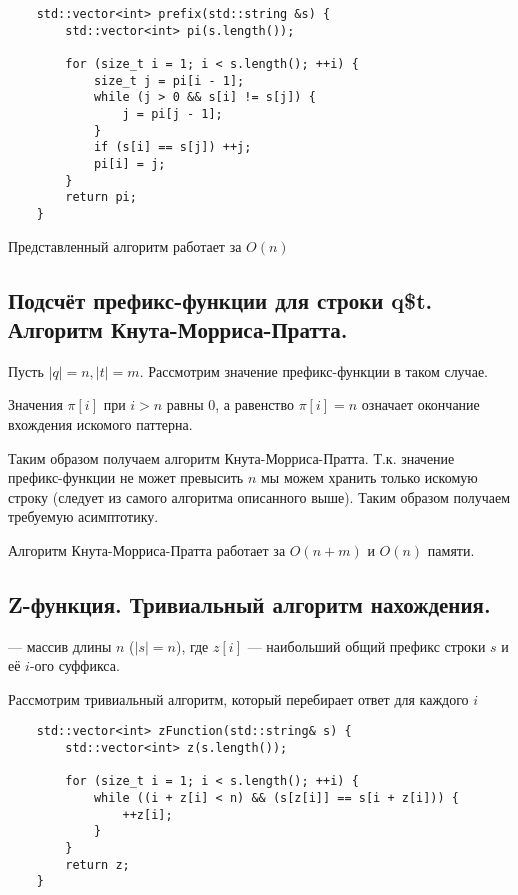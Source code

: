 \begin{lstlisting}
	std::vector<int> prefix(std::string &s) {
		std::vector<int> pi(s.length());

		for (size_t i = 1; i < s.length(); ++i) {
			size_t j = pi[i - 1];
			while (j > 0 && s[i] != s[j]) {
				j = pi[j - 1];
			}
			if (s[i] == s[j]) ++j;
			pi[i] = j;
		}
		return pi;
	}
\end{lstlisting}

\begin{remark}
	Представленный алгоритм работает за $O(n)$
\end{remark}

\subsection{Подсчёт префикс-функции для строки q\$t. Алгоритм Кнута-Морриса-Пратта.}

Пусть $\left| q \right| = n, \left| t \right| = m$. Рассмотрим значение префикс-функции в таком случае.

\begin{remark}
	Значения $\pi [i]$ при $i > n$ равны $0$, а равенство $\pi[i] = n$ означает окончание вхождения искомого
	паттерна.
\end{remark}

Таким образом получаем алгоритм Кнута-Морриса-Пратта. Т.к. значение префикс-функции не может превысить $n$ мы
можем хранить только искомую строку (следует из самого алгоритма описанного выше). Таким образом получаем требуемую асимптотику.

\begin{remark}
	Алгоритм Кнута-Морриса-Пратта работает за $O(n+m)$ и $O(n)$ памяти.
\end{remark}

\subsection{Z-функция. Тривиальный алгоритм нахождения.}

\begin{definition}
	 --- массив длины $n$ ($\left| s \right| = n$), где $z[i]$ --- наибольший общий
	префикс строки $s$ и её $i$-ого суффикса.
\end{definition}

Рассмотрим тривиальный алгоритм, который перебирает ответ для каждого $i$

\begin{lstlisting}
	std::vector<int> zFunction(std::string& s) {
		std::vector<int> z(s.length());

		for (size_t i = 1; i < s.length(); ++i) {
			while ((i + z[i] < n) && (s[z[i]] == s[i + z[i])) {
				++z[i];
			}
		}
		return z;
	}
\end{lstlisting}

